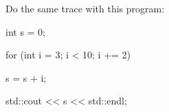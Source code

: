 Do the same trace with this program:

\begin{console}

int s = 0;

for (int i = 3; i < 10; i += 2)

{   

    s = s + i;

}

std::cout << s << std::endl;

\end{console}

